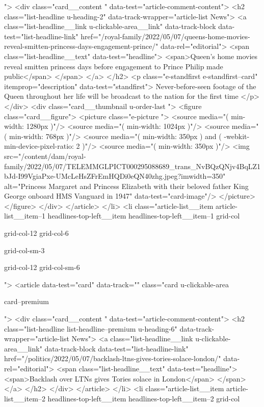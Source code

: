 {{{			
			 ">
<div class="card__content " data-test="article-comment-content">
<h2 class="list-headline  u-heading-2" data-track-wrapper="article-list News">
<a class="list-headline__link u-clickable-area__link" data-track-block data-test="list-headline-link" href="/royal-family/2022/05/07/queens-home-movies-reveal-smitten-princess-days-engagement-prince/" data-rel="editorial">
<span class="list-headline__text" data-test="headline">
<span>Queen’s home movies reveal smitten princess days before engagement to Prince Philip made public</span>
</span>
</a>
</h2>
<p class="e-standfirst  e-standfirst--card" itemprop="description" data-test="standfirst">
Never-before-seen footage of the Queen throughout her life will be broadcast to the nation for the first time
</p>
</div>
<div class="card__thumbnail u-order-last ">
<figure class="card__figure">
<picture class="e-picture   ">
<source media="( min-width: 1280px )"/>
<source media="( min-width: 1024px )"/>
<source media="( min-width: 768px )"/>
<source media="( min-width: 350px ) and ( -webkit-min-device-pixel-ratio: 2 )"/>
<source media="( min-width: 350px )"/>
<img src="/content/dam/royal-family/2022/05/07/TELEMMGLPICT000295088689_trans_NvBQzQNjv4BqLZ1bJd-I99VgiaPxe-UMcLeHsZFrEmHQDi0eQN40zhg.jpeg?imwidth=350" alt="Princess Margaret and Princess Elizabeth with their beloved father King George onboard HMS Vanguard in 1947" data-test="card-image"/>
</picture>
</figure>
</div>
</article>
</li>
<li class="article-list__item article-list__item--1 headlines-top-left__item headlines-top-left__item--1
			grid-col
			
			
			
			grid-col-12
			grid-col-6
			
			
			
			
			
			grid-col-sm-3
			
			
			
			grid-col-12 grid-col-sm-6
			
			
			
			
			">
<article data-test="card" data-track="" class="card
			u-clickable-area
			
			
			card--premium
			
			
			
			
			
			 ">
<div class="card__content " data-test="article-comment-content">
<h2 class="list-headline list-headline--premium u-heading-6" data-track-wrapper="article-list News">
<a class="list-headline__link u-clickable-area__link" data-track-block data-test="list-headline-link" href="/politics/2022/05/07/backlash-ltns-gives-tories-solace-london/" data-rel="editorial">
<span class="list-headline__text" data-test="headline">
<span>Backlash over LTNs gives Tories solace in London</span>
</span>
</a>
</h2>
</div>
</article>
</li>
<li class="article-list__item article-list__item--2 headlines-top-left__item headlines-top-left__item--2
			grid-col
			
}}}
